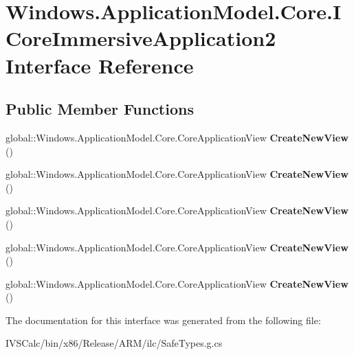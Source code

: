 \hypertarget{interface_windows_1_1_application_model_1_1_core_1_1_i_core_immersive_application2}{}\section{Windows.\+Application\+Model.\+Core.\+I\+Core\+Immersive\+Application2 Interface Reference}
\label{interface_windows_1_1_application_model_1_1_core_1_1_i_core_immersive_application2}
\subsection*{Public Member Functions}
\begin{DoxyCompactItemize}
\item 
\mbox{\label{interface_windows_1_1_application_model_1_1_core_1_1_i_core_immersive_application2_a4249c6d7922228c472e71b1fae5b83b2}} 
global\+::\+Windows.\+Application\+Model.\+Core.\+Core\+Application\+View {\bfseries Create\+New\+View} ()
\item 
\mbox{\label{interface_windows_1_1_application_model_1_1_core_1_1_i_core_immersive_application2_a4249c6d7922228c472e71b1fae5b83b2}} 
global\+::\+Windows.\+Application\+Model.\+Core.\+Core\+Application\+View {\bfseries Create\+New\+View} ()
\item 
\mbox{\label{interface_windows_1_1_application_model_1_1_core_1_1_i_core_immersive_application2_a4249c6d7922228c472e71b1fae5b83b2}} 
global\+::\+Windows.\+Application\+Model.\+Core.\+Core\+Application\+View {\bfseries Create\+New\+View} ()
\item 
\mbox{\label{interface_windows_1_1_application_model_1_1_core_1_1_i_core_immersive_application2_a4249c6d7922228c472e71b1fae5b83b2}} 
global\+::\+Windows.\+Application\+Model.\+Core.\+Core\+Application\+View {\bfseries Create\+New\+View} ()
\item 
\mbox{\label{interface_windows_1_1_application_model_1_1_core_1_1_i_core_immersive_application2_a4249c6d7922228c472e71b1fae5b83b2}} 
global\+::\+Windows.\+Application\+Model.\+Core.\+Core\+Application\+View {\bfseries Create\+New\+View} ()
\end{DoxyCompactItemize}


The documentation for this interface was generated from the following file\+:\begin{DoxyCompactItemize}
\item 
I\+V\+S\+Calc/bin/x86/\+Release/\+A\+R\+M/ilc/Safe\+Types.\+g.\+cs\end{DoxyCompactItemize}

